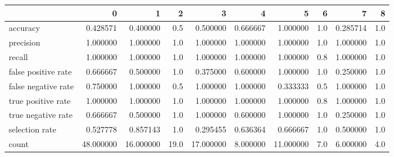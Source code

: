 \begin{tabular}{lrrrrrrrrr}
\toprule
{} &          0 &          1 &     2 &          3 &         4 &          5 &    6 &         7 &    8 \\
\midrule
accuracy            &   0.428571 &   0.400000 &   0.5 &   0.500000 &  0.666667 &   1.000000 &  1.0 &  0.285714 &  1.0 \\
precision           &   1.000000 &   1.000000 &   1.0 &   1.000000 &  1.000000 &   1.000000 &  1.0 &  1.000000 &  1.0 \\
recall              &   1.000000 &   1.000000 &   1.0 &   1.000000 &  1.000000 &   1.000000 &  0.8 &  1.000000 &  1.0 \\
false positive rate &   0.666667 &   0.500000 &   1.0 &   0.375000 &  0.600000 &   1.000000 &  1.0 &  0.250000 &  1.0 \\
false negative rate &   0.750000 &   1.000000 &   0.5 &   1.000000 &  1.000000 &   0.333333 &  0.5 &  1.000000 &  1.0 \\
true positive rate  &   1.000000 &   1.000000 &   1.0 &   1.000000 &  1.000000 &   1.000000 &  0.8 &  1.000000 &  1.0 \\
true negative rate  &   0.666667 &   0.500000 &   1.0 &   1.000000 &  0.600000 &   1.000000 &  1.0 &  0.250000 &  1.0 \\
selection rate      &   0.527778 &   0.857143 &   1.0 &   0.295455 &  0.636364 &   0.666667 &  1.0 &  0.500000 &  1.0 \\
count               &  48.000000 &  16.000000 &  19.0 &  17.000000 &  8.000000 &  11.000000 &  7.0 &  6.000000 &  4.0 \\
\bottomrule
\end{tabular}
